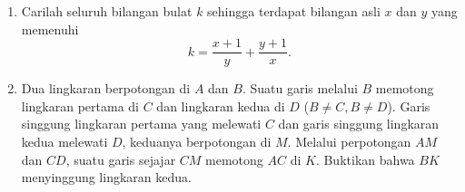 \documentclass[12pt]{scrartcl}
\begin{document}
\begin{enumerate}[resume]
	\item Carilah seluruh bilangan bulat $k$ sehingga terdapat bilangan asli $x$ dan $y$ yang memenuhi $$k= \frac{x+1}{y}+\frac{y+1}{x}.$$ 
	
	\item Dua lingkaran berpotongan di $A$ dan $B$. Suatu garis melalui $B$ memotong lingkaran pertama di $C$ dan lingkaran kedua di $D$ ($B \neq C, B \neq D$).  Garis singgung lingkaran pertama yang melewati $C$ dan garis singgung lingkaran kedua melewati $D$, keduanya berpotongan di $M$. Melalui perpotongan $AM$ dan $CD$, suatu garis sejajar $CM$ memotong $AC$ di $K$. Buktikan bahwa $BK$ menyinggung lingkaran kedua.
	
\end{enumerate}
\end{document}
